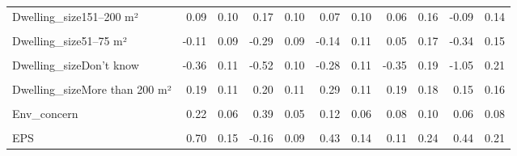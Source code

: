 \begin{table}
\begin{tabular}[t]{lrrrrrrrrrr}
Dwelling\_size151–200 m² & 0.09 & 0.10 & 0.17 & 0.10 & 0.07 & 0.10 & 0.06 & 0.16 & -0.09 & 0.14\\
\cellcolor{gray!10}{Dwelling\_size26–50 m²} & \cellcolor{gray!10}{-0.09} & \cellcolor{gray!10}{0.12} & \cellcolor{gray!10}{-0.17} & \cellcolor{gray!10}{0.11} & \cellcolor{gray!10}{-0.01} & \cellcolor{gray!10}{0.14} & \cellcolor{gray!10}{-0.07} & \cellcolor{gray!10}{0.23} & \cellcolor{gray!10}{-0.44} & \cellcolor{gray!10}{0.20}\\
Dwelling\_size51–75 m² & -0.11 & 0.09 & -0.29 & 0.09 & -0.14 & 0.11 & 0.05 & 0.17 & -0.34 & 0.15\\
\cellcolor{gray!10}{Dwelling\_size76–100 m²} & \cellcolor{gray!10}{-0.19} & \cellcolor{gray!10}{0.08} & \cellcolor{gray!10}{-0.12} & \cellcolor{gray!10}{0.08} & \cellcolor{gray!10}{-0.12} & \cellcolor{gray!10}{0.09} & \cellcolor{gray!10}{-0.01} & \cellcolor{gray!10}{0.15} & \cellcolor{gray!10}{-0.18} & \cellcolor{gray!10}{0.13}\\
Dwelling\_sizeDon't know & -0.36 & 0.11 & -0.52 & 0.10 & -0.28 & 0.11 & -0.35 & 0.19 & -1.05 & 0.21\\
\cellcolor{gray!10}{Dwelling\_sizeLess than 25 m²} & \cellcolor{gray!10}{-0.42} & \cellcolor{gray!10}{0.24} & \cellcolor{gray!10}{-1.04} & \cellcolor{gray!10}{0.25} & \cellcolor{gray!10}{-0.43} & \cellcolor{gray!10}{0.28} & \cellcolor{gray!10}{0.31} & \cellcolor{gray!10}{0.35} & \cellcolor{gray!10}{-0.52} & \cellcolor{gray!10}{0.37}\\
Dwelling\_sizeMore than 200 m² & 0.19 & 0.11 & 0.20 & 0.11 & 0.29 & 0.11 & 0.19 & 0.18 & 0.15 & 0.16\\
\cellcolor{gray!10}{Rural} & \cellcolor{gray!10}{0.11} & \cellcolor{gray!10}{0.06} & \cellcolor{gray!10}{0.06} & \cellcolor{gray!10}{0.06} & \cellcolor{gray!10}{0.09} & \cellcolor{gray!10}{0.07} & \cellcolor{gray!10}{0.19} & \cellcolor{gray!10}{0.11} & \cellcolor{gray!10}{0.21} & \cellcolor{gray!10}{0.10}\\
Env\_concern & 0.22 & 0.06 & 0.39 & 0.05 & 0.12 & 0.06 & 0.08 & 0.10 & 0.06 & 0.08\\
\cellcolor{gray!10}{Gov\_support} & \cellcolor{gray!10}{10.27} & \cellcolor{gray!10}{2.49} & \cellcolor{gray!10}{9.74} & \cellcolor{gray!10}{2.49} & \cellcolor{gray!10}{10.64} & \cellcolor{gray!10}{2.64} & \cellcolor{gray!10}{12.03} & \cellcolor{gray!10}{2.89} & \cellcolor{gray!10}{12.86} & \cellcolor{gray!10}{3.79}\\
EPS & 0.70 & 0.15 & -0.16 & 0.09 & 0.43 & 0.14 & 0.11 & 0.24 & 0.44 & 0.21\\

\end{tabular}
\end{table}
